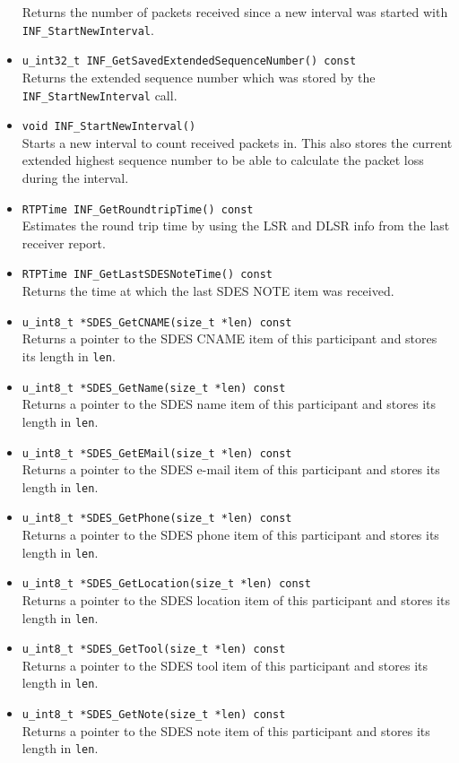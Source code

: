 \documentclass[12pt,a4paper]{article}
\begin{document}
\begin{itemize}
						Returns the number of packets received since a new interval was
						started with {\tt INF\_StartNewInterval}.
					\item {\tt u\_int32\_t INF\_GetSavedExtendedSequenceNumber() const}\\
						Returns the extended sequence number which was stored by the
						{\tt INF\_StartNewInterval} call.
					\item {\tt void INF\_StartNewInterval()}\\
						Starts a new interval to count received packets in. This also stores
						the current extended highest sequence number to be able to calculate
						the packet loss during the interval.
					\item {\tt RTPTime INF\_GetRoundtripTime() const}\\
						Estimates the round trip time by using the LSR and DLSR info from the
						last receiver report.
					\item {\tt RTPTime INF\_GetLastSDESNoteTime() const}\\
						Returns the time at which the last SDES NOTE item was received.
					\item {\tt u\_int8\_t *SDES\_GetCNAME(size\_t *len) const}\\
						Returns a pointer to the SDES CNAME item of this participant and stores
						its length in {\tt len}.
					\item {\tt u\_int8\_t *SDES\_GetName(size\_t *len) const}\\
						Returns a pointer to the SDES name item of this participant and stores
						its length in {\tt len}.
					\item {\tt u\_int8\_t *SDES\_GetEMail(size\_t *len) const}\\
						Returns a pointer to the SDES e-mail item of this participant and stores
						its length in {\tt len}.
					\item {\tt u\_int8\_t *SDES\_GetPhone(size\_t *len) const}\\
						Returns a pointer to the SDES phone item of this participant and stores
						its length in {\tt len}.
					\item {\tt u\_int8\_t *SDES\_GetLocation(size\_t *len) const}\\
						Returns a pointer to the SDES location item of this participant and stores
						its length in {\tt len}.
					\item {\tt u\_int8\_t *SDES\_GetTool(size\_t *len) const}\\
						Returns a pointer to the SDES tool item of this participant and stores
						its length in {\tt len}.
					\item {\tt u\_int8\_t *SDES\_GetNote(size\_t *len) const}\\
						Returns a pointer to the SDES note item of this participant and stores
						its length in {\tt len}.
				\end{itemize}
\end{document}
